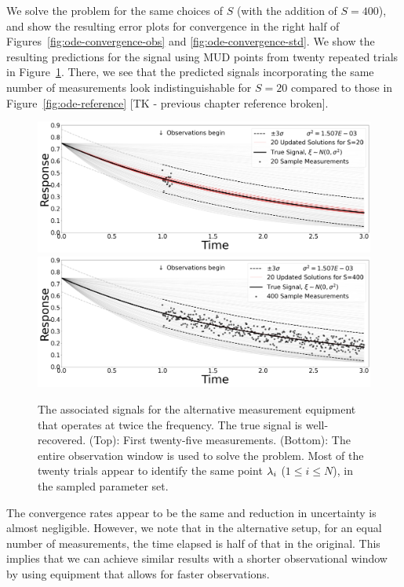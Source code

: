 We solve the problem for the same choices of $S$ (with the addition of $S=400$), and show the resulting error plots for convergence in the right half of Figures~\ref{fig:ode-convergence-obs} and \ref{fig:ode-convergence-std}.
We show the resulting predictions for the signal using MUD points from twenty repeated trials in Figure~\ref{fig:ode-alt-reference}.
There, we see that the predicted signals incorporating the same number of measurements look indistinguishable for $S=20$ compared to those in Figure~\ref{fig:ode-reference} [TK - previous chapter reference broken].

\begin{figure}[htbp]
  \includegraphics[width=\linewidth]{figures/ode/ode-alt_20_reference_solution}
  \includegraphics[width=\linewidth]{figures/ode/ode-alt_400_reference_solution}
  \caption{The associated signals for the alternative measurement equipment that operates at twice the frequency.
  The true signal is well-recovered.
  (Top): First twenty-five measurements.
  (Bottom): The entire observation window is used to solve the problem. Most of the twenty trials appear to identify the same point $\lambda_i$ ($1\leq i \leq N$), in the sampled parameter set.
  }
  \label{fig:ode-alt-reference}
\end{figure}


The convergence rates appear to be the same and reduction in uncertainty is almost negligible.
However, we note that in the alternative setup, for an equal number of measurements, the time elapsed is half of that in the original.
This implies that we can achieve similar results with a shorter observational window by using equipment that allows for faster observations.

